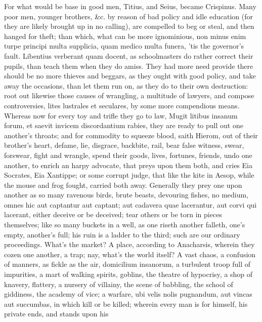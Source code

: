 {For what would be base in good men, Titius, and Seius, became
Crispinus.
Many poor men, younger brothers, \&c. by reason of bad policy and
idle education (for they are likely brought up in no calling), are
compelled to beg or steal, and then hanged for theft; than which, what
can be more ignominious, non minus enim turpe principi multa supplicia,
quam medico multa funera, 'tis the governor's fault. Libentius
verberant quam docent, as schoolmasters do rather correct their pupils,
than teach them when they do amiss. They had more need provide
there should be no more thieves and beggars, as they ought with good
policy, and take away the occasions, than let them run on, as they do
to their own destruction: root out likewise those causes of wrangling,
a multitude of lawyers, and compose controversies, lites lustrales et
seculares, by some more compendious means. Whereas now for every toy
and trifle they go to law, Mugit litibus insanum forum, et saevit
invicem discordantium rabies, they are ready to pull out one another's
throats; and for commodity to squeeze blood, saith Hierom, out of
their brother's heart, defame, lie, disgrace, backbite, rail, bear
false witness, swear, forswear, fight and wrangle, spend their goods,
lives, fortunes, friends, undo one another, to enrich an harpy
advocate, that preys upon them both, and cries Eia Socrates, Eia
Xantippe; or some corrupt judge, that like the kite in Aesop,
while the mouse and frog fought, carried both away. Generally they prey
one upon another as so many ravenous birds, brute beasts, devouring
fishes, no medium, omnes hic aut captantur aut captant; aut
cadavera quae lacerantur, aut corvi qui lacerant, either deceive or be
deceived; tear others or be torn in pieces themselves; like so many
buckets in a well, as one riseth another falleth, one's empty,
another's full; his ruin is a ladder to the third; such are our
ordinary proceedings. What's the market? A place, according to
Anacharsis, wherein they cozen one another, a trap; nay, what's
the world itself? A vast chaos, a confusion of manners, as fickle
as the air, domicilium insanorum, a turbulent troop full of impurities,
a mart of walking spirits, goblins, the theatre of hypocrisy, a shop of
knavery, flattery, a nursery of villainy, the scene of babbling, the
school of giddiness, the academy of vice; a warfare, ubi velis nolis
pugnandum, aut vincas aut succumbas, in which kill or be killed;
wherein every man is for himself, his private ends, and stands upon his
}
